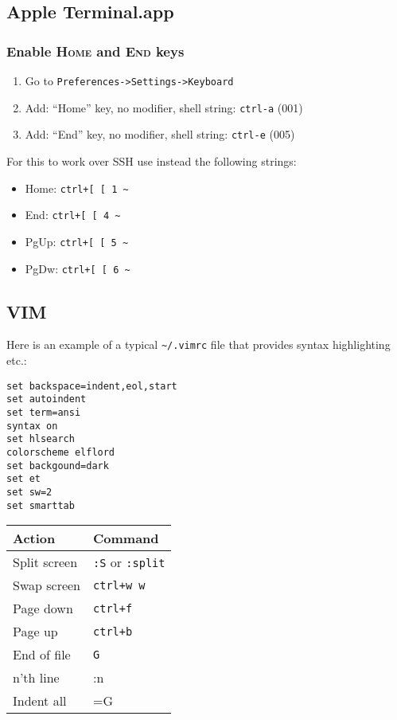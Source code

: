 \documentclass[a4paper,10pt]{article}
\begin{document}
\subsection{Apple Terminal.app}
\subsubsection{Enable \textsc{Home} and \textsc{End} keys}
\begin{enumerate}
\item Go to \verb"Preferences->Settings->Keyboard"
\item Add: ``Home'' key, no modifier, shell string: \verb"ctrl-a" (001)
\item Add: ``End'' key, no modifier, shell string: \verb"ctrl-e" (005)
\end{enumerate}
For this to work over SSH use instead the following strings:
\begin{itemize}
\item Home: \verb"ctrl+[ [ 1 ~"
\item End: \verb"ctrl+[ [ 4 ~"
\item PgUp: \verb"ctrl+[ [ 5 ~"
\item PgDw: \verb"ctrl+[ [ 6 ~"
\end{itemize}

\subsection{VIM}
Here is an example of a typical \verb"~/.vimrc" file that provides syntax highlighting etc.:
\begin{footnotesize}\begin{verbatim}
set backspace=indent,eol,start
set autoindent
set term=ansi
syntax on
set hlsearch
colorscheme elflord
set backgound=dark
set et
set sw=2
set smarttab
\end{verbatim}\end{footnotesize}
\begin{table}[h]
\begin{small}
\begin{tabular}{ll}\hline\hline
Action         & Command \\\hline
Split screen   & \verb":S" or \verb":split"\\
Swap screen    & \verb"ctrl+w w"\\
Page down      & \verb"ctrl+f"\\
Page up        & \verb"ctrl+b"\\
End of file    & \verb"G"\\
n'th line      & :n\\
Indent all     & =G\\
\hline
\end{tabular}\end{small}\end{table}
\end{document}
